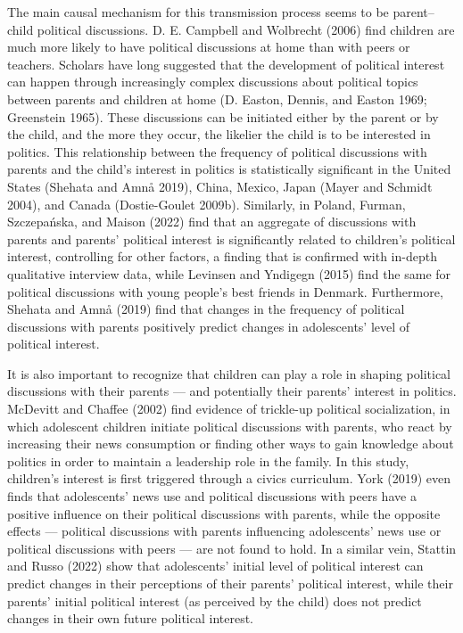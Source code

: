 \documentclass[
  letterpaper,
  DIV=11,
  numbers=noendperiod]{scrreprt}
\begin{document}
The main causal mechanism for this transmission process seems to be
parent--child political discussions. D. E. Campbell and Wolbrecht (2006)
find children are much more likely to have political discussions at home
than with peers or teachers. Scholars have long suggested that the
development of political interest can happen through increasingly
complex discussions about political topics between parents and children
at home (D. Easton, Dennis, and Easton 1969; Greenstein 1965). These
discussions can be initiated either by the parent or by the child, and
the more they occur, the likelier the child is to be interested in
politics. This relationship between the frequency of political
discussions with parents and the child's interest in politics is
statistically significant in the United States (Shehata and Amnå 2019),
China, Mexico, Japan (Mayer and Schmidt 2004), and Canada (Dostie-Goulet
2009b). Similarly, in Poland, Furman, Szczepańska, and Maison (2022)
find that an aggregate of discussions with parents and parents'
political interest is significantly related to children's political
interest, controlling for other factors, a finding that is confirmed
with in-depth qualitative interview data, while Levinsen and Yndigegn
(2015) find the same for political discussions with young people's best
friends in Denmark. Furthermore, Shehata and Amnå (2019) find that
changes in the frequency of political discussions with parents
positively predict changes in adolescents' level of political interest.

It is also important to recognize that children can play a role in
shaping political discussions with their parents --- and potentially
their parents' interest in politics. McDevitt and Chaffee (2002) find
evidence of trickle-up political socialization, in which adolescent
children initiate political discussions with parents, who react by
increasing their news consumption or finding other ways to gain
knowledge about politics in order to maintain a leadership role in the
family. In this study, children's interest is first triggered through a
civics curriculum. York (2019) even finds that adolescents' news use and
political discussions with peers have a positive influence on their
political discussions with parents, while the opposite effects ---
political discussions with parents influencing adolescents' news use or
political discussions with peers --- are not found to hold. In a similar
vein, Stattin and Russo (2022) show that adolescents' initial level of
political interest can predict changes in their perceptions of their
parents' political interest, while their parents' initial political
interest (as perceived by the child) does not predict changes in their
own future political interest.
\end{document}

